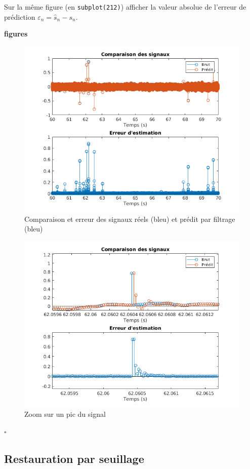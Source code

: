 \documentclass{article}
\newcommand{\debutrep}[1]{\color{blue}\begin{center} \hrulefill \textbf{ #1 } \hrulefill \end{center} }
\newcommand{\finrep}{\vspace*{5mm}\hfill $\square$\color{black}\vspace*{5mm}}
\begin{document}
Sur la même figure (en {\tt subplot(212)}) afficher la valeur absolue de l'erreur de prédiction $\varepsilon_n = \hat{s}_n - s_n$.

\debutrep{figures}
\begin{figure}[H]
    \includegraphics[width=0.857\columnwidth]{prediction-erreur.png}
    \caption{Comparaison et erreur des signaux réels (bleu) et prédit par filtrage (bleu)}
\end{figure}
\begin{figure}[H]
    \includegraphics[width=0.9\columnwidth]{prediction-erreur-zomm.png}
    \caption{Zoom sur un pic du signal}
\end{figure}
\finrep

\subsection{Restauration par seuillage}
\end{document}

